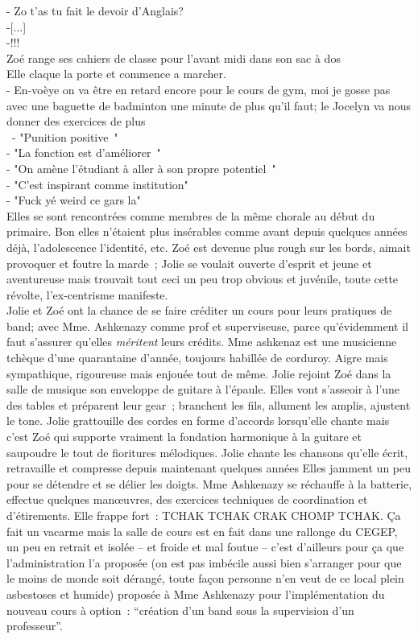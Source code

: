 - Zo t’as tu fait le devoir d’Anglais?  \\
-[...]\\
-!!!\\


Zoé range ses cahiers de classe pour l’avant midi dans son sac à dos \\
Elle claque la porte et commence a marcher.\\
- En-voèye on va être en retard encore pour le cours de gym, moi je gosse pas
avec une baguette de badminton une minute de plus qu’il faut; le Jocelyn va
nous donner des exercices de plus\\\
- "Punition positive "\\
- "La fonction est d’améliorer "\\
- "On amène l’étudiant à aller à son propre potentiel "\\
- "C’est inspirant comme institution"\\
- "Fuck yé weird ce gars la"\\

Elles se sont rencontrées comme membres de la même chorale au début du
primaire. Bon elles n’étaient plus insérables comme avant depuis quelques
années déjà, l’adolescence l’identité, etc. Zoé est devenue plus rough sur
les bords, aimait provoquer et foutre la marde ; Jolie se voulait ouverte
d’esprit et jeune et aventureuse mais trouvait tout ceci un peu trop obvious et
juvénile, toute cette révolte, l’ex-centrisme manifeste.\\

Jolie et Zoé ont la chance de se faire créditer un cours pour leurs pratiques
de band; avec Mme. Ashkenazy comme prof et superviseuse, parce qu'évidemment
il faut s'assurer qu'elles \textit{méritent} leurs crédits. 
Mme ashkenaz est une musicienne tchèque d’une
quarantaine d’année, toujours habillée de corduroy. Aigre mais sympathique,
rigoureuse mais enjouée tout de même. Jolie rejoint Zoé dans la salle de
musique son enveloppe de guitare à l’épaule. Elles vont s’asseoir à l’une des
tables et préparent leur gear ; branchent les fils, allument les amplis,
ajustent le tone. Jolie grattouille des cordes en forme d’accords lorsqu’elle
chante mais c’est Zoé qui supporte vraiment la fondation harmonique à la
guitare et saupoudre le tout de fioritures mélodiques. Jolie chante les
chansons qu’elle écrit, retravaille et compresse depuis maintenant quelques
années Elles jamment un peu pour se détendre et se délier les doigts. Mme
Ashkenazy se réchauffe à la batterie, effectue quelques manœuvres, des exercices
techniques de coordination et d’étirements.
Elle frappe fort : TCHAK TCHAK CRAK CHOMP TCHAK.
Ça fait un vacarme mais la salle de cours est en fait dans une rallonge du
CEGEP, un peu en retrait et isolée – et froide et mal foutue – c’est
d’ailleurs pour ça que l’administration l’a proposée (on est pas imbécile aussi
bien s’arranger pour que le moins de monde soit dérangé, toute façon personne
n’en veut de ce local plein asbestoses et humide) proposée à Mme Ashkenazy pour
l’implémentation du nouveau cours à option : “création d’un band sous la
supervision d’un professeur”.

